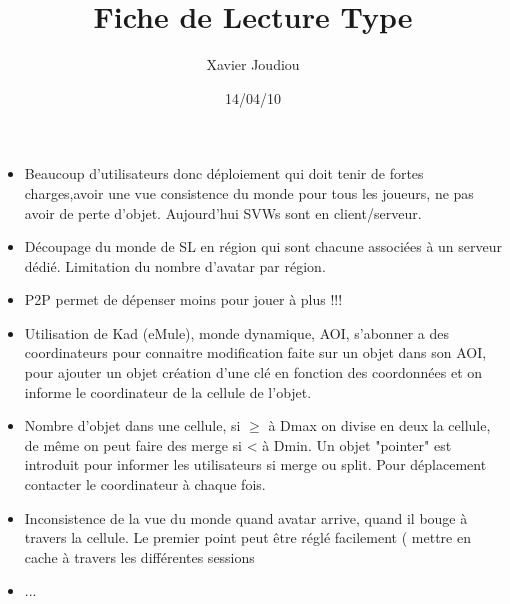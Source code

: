 \documentclass[11pt,a4paper]{article}
\title{Fiche de Lecture Type}
\author{Xavier Joudiou}
\date{14/04/10}
\begin{document}
	
  \begin{itemize}
  \renewcommand{\labelitemi}{$\Rightarrow$}
	\item Beaucoup d'utilisateurs donc déploiement qui doit tenir de fortes charges,avoir une vue consistence du monde pour tous les joueurs, ne pas avoir de perte d'objet. Aujourd'hui SVWs sont en client/serveur.
	\item Découpage du monde de SL en région qui sont chacune associées à un serveur dédié. Limitation du nombre d'avatar par région.
	\item P2P permet de dépenser moins pour jouer à plus !!!
	\item Utilisation de Kad (eMule), monde dynamique, AOI, s'abonner a des coordinateurs pour connaitre modification faite sur un objet dans son AOI, pour ajouter un objet création d'une clé en fonction des coordonnées et on informe le coordinateur de la cellule de l'objet.
	\item Nombre d'objet dans une cellule, si $\ge$ à Dmax on divise en deux la cellule, de même on peut faire des merge si < à Dmin. Un objet "pointer" est introduit pour informer les utilisateurs si merge ou split. Pour déplacement contacter le coordinateur à chaque fois.
	\item Inconsistence de la vue du monde quand avatar arrive, quand il bouge à travers la cellule. Le premier point peut être réglé facilement ( mettre en cache à travers les différentes sessions    
	\item ...
  \end{itemize}
\end{document}
